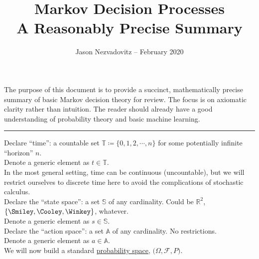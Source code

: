 





\title{\textbf{Markov Decision Processes}\\ \large{A Reasonably Precise Summary}\vspace{-6ex}}
\author{\vspace{-5ex}}
\date{\small{Jason Nezvadovitz -- February 2020}}
\maketitle


The purpose of this document is to provide a succinct, mathematically precise summary of basic Markov decision theory for review. The focus is on axiomatic clarity rather than intuition. The reader should already have a good understanding of probability theory and basic machine learning.

\vspace{0.2in}
\hrule
\vspace{0.2in}

Declare ``time'': a countable set $\mathbb{T} \coloneqq \{0, 1, 2, \cdots, n\}$ for some potentially infinite ``horizon'' $n$.\\
Denote a generic element as $t \in \mathbb{T}$.\\

In the most general setting, time can be continuous (uncountable), but we will restrict ourselves to discrete time here to avoid the complications of stochastic calculus.\\

Declare the ``state space'': a set $\mathbb{S}$ of any cardinality. Could be $\mathbb{R}^2$, $\{\text{\Smiley},\text{\Cooley},\text{\Winkey}\}$, whatever.\\
Denote a generic element as $s \in \mathbb{S}$.\\

Declare the ``action space'': a set $\mathbb{A}$ of any cardinality. No restrictions.\\
Denote a generic element as $a \in \mathbb{A}$.\\

We will now build a standard \href{https://en.wikipedia.org/wiki/Probability_space}{probability space}, $\boldsymbol{(}\Omega, \mathcal{F}, P\boldsymbol{)}$.\\

